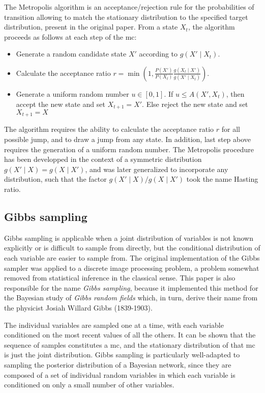 The Metropolis algorithm is an acceptance/rejection rule for the probabilities of {transition} allowing to match the stationary distribution to the specified target distribution, present in the original paper.
From a state $X_t$, the algorithm proceeds as follows at each step of the \gls{mc}:
\begin{itemize}
	\item Generate a random candidate state $X'$ according to $g(X'\mid X_t)$.
	\item Calculate the acceptance ratio $\displaystyle r=\min \left(1,{\frac {P(X')}{P(X_{t})}}{\frac {g(X_{t}\mid X')}{g(X'\mid X_{t})}}\right)$.
	\item Generate a uniform random number $u\in [0,1]$.
	If $u\leq A(X',X_{t})$, then accept the new state and set $X_{t+1}=X'$.
	Else reject the new state and set $X_{t+1}=X$
\end{itemize}

The algorithm requires the ability to calculate the acceptance ratio $r$ for all possible jump, and to draw a jump from any state. 
In addition, last step above requires the generation of a uniform random number.
The Metropolis procedure has been developped in the context of a symmetric distribution $g(X'\mid X) = g(X \mid X')$, and was later generalized to incorporate any distribution, such that the factor $g(X'\mid X) / g(X \mid X')$ took the name Hasting ratio.

\subsection{Gibbs sampling}

Gibbs sampling is applicable when a joint distribution of variables is not known explicitly or is difficult to sample from directly, but the conditional distribution of each variable are easier to sample from.
The original implementation of the Gibbs sampler was applied to a discrete image processing problem, a problem somewhat removed from statistical inference in the classical sense.
This paper is also responsible for the name {\it Gibbs sampling}, because it implemented this method for the Bayesian study of {\it Gibbs random fields} which, in turn, derive their name from the physicist Josiah Willard Gibbs (1839-1903).

The individual variables are sampled one at a time, with each variable conditioned on the most recent values of all the others.
It can be shown that the sequence of samples constitutes a \gls{mc}, and the stationary distribution of that \gls{mc} is just the joint distribution.
Gibbs sampling is particularly well-adapted to sampling the \gls{posterior} distribution of a Bayesian network, since they are composed of a set of individual random variables in which each variable is conditioned on only a small number of other variables.


